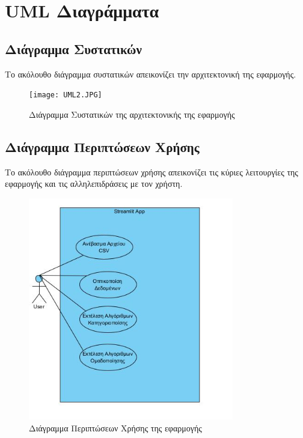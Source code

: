 \documentclass[a4paper,12pt]{article}
\begin{document}
\par\vspace{10pt}

\section{UML Διαγράμματα}
\label{sec:uml}

\subsection{Διάγραμμα Συστατικών}
Το ακόλουθο διάγραμμα συστατικών απεικονίζει την αρχιτεκτονική της εφαρμογής.

\begin{figure}[h!]
\centering
\texttt{[image: UML2.JPG]}
\caption{Διάγραμμα Συστατικών της αρχιτεκτονικής της εφαρμογής}
\label{fig:component}
\end{figure}

\subsection{Διάγραμμα Περιπτώσεων Χρήσης}
Το ακόλουθο διάγραμμα περιπτώσεων χρήσης απεικονίζει τις κύριες λειτουργίες της εφαρμογής και τις αλληλεπιδράσεις με τον χρήστη.

\begin{figure}[h!]
\centering
\includegraphics[width=0.8\textwidth]{UML1.JPG}
\caption{Διάγραμμα Περιπτώσεων Χρήσης της εφαρμογής}
\label{fig:usecase}
\end{figure}
\end{document}
